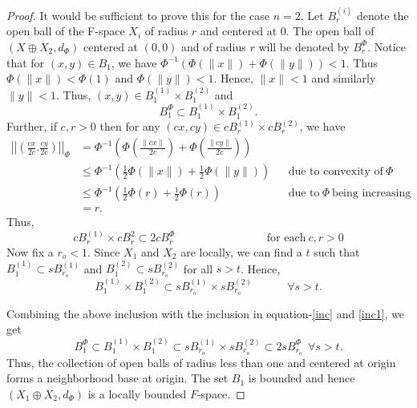\documentclass[10pt,a4paper]{amsart}
\begin{document}
	 \begin{proof}
	 	It would be sufficient to prove this for the case $n=2$. Let $B_r^{(i)}$ denote the open ball of the F-space $X_i$ of radius $r$ and centered at $0$.  The open ball of $\left(X\oplus X_2,d_\Phi\right)$ centered at $(0,0)$ and of radius $r$ will be denoted by $B_r^\Phi$. Notice that for $(x,y)\in B_1$, we have 
	 	$\Phi^{-1}\left(\Phi(\|x\|)+\Phi(\|y\|)\right)< 1$. Thus $\Phi(\|x\|)<\Phi(1)$ and $\Phi(\|y\|)<1$. Hence, $\|x\|<1$ and similarly $\|y\|<1$. Thus, $(x,y)\in B_1^{(1)}\times B_1^{(2)}$ and 
	 	\begin{equation}\label{inc}
	 		B_1^\Phi\subset B_1^{(1)}\times B_1^{(2)}.
	 	\end{equation}
	 	Further, if $c,r>0$ then for any $(cx,cy)\in cB_{r}^{(1)}\times cB_{r}^{(2)}$, we have 
	 	\begin{align}
	 		\left|\left|\left(\frac{cx}{2c}.\frac{cy}{2c}\right)\right|\right|_\Phi&=\Phi^{-1}\left(\Phi(\frac{\|cx\|}{2c})+\Phi(\frac{\|cy\|}{2c})\right)\nonumber\\&\leq\Phi^{-1}\left(\frac{1}{2}\Phi(\|x\|)+\frac{1}{2}\Phi(\|y\|)\right)&&\text{due to convexity of}~\Phi\nonumber\\&\leq \Phi^{-1}\left(\frac{1}{2}\Phi(r)+\frac{1}{2}\Phi(r)\right)&&\text{due to}~\Phi~\text{being increasing}\nonumber\\&=r.
	 	\end{align}
	 	Thus, \begin{equation}\label{inc1}
cB_{r}^{(1)}\times cB_{r}^{2}\subset 2cB_r^{\Phi}~~~~~~~~~~~~~~~~~~~~~~~~~~~~~~~~~~~~~\text{for each}~c,r>0
	 	\end{equation}
	 	Now fix a $r_o<1$. Since $X_1$ and $X_2$ are locally, we can find a $t$ such that $B_1^{(1)}\subset sB_{r_o}^{(1)}$ and $B_1^{(2)}\subset sB_{r_o}^{(2)}$ for all $s>t$. Hence, 
	 	\begin{equation}
	 		B_1^{(1)}\times B_1^{(2)}\subset sB_{r_o}^{(1)}\times sB_{r_o}^{(2)}~~~~~~~~~~~~~~\forall s>t.
	 	\end{equation}
	 	
	 	Combining the above inclusion with the inclusion in equation-\ref{inc} and \ref{inc1}, we get 
	 	\begin{equation}
B_1^\Phi\subset	B_1^{(1)}\times B_1^{(2)}\subset sB_{r_o}^{(1)}\times sB_{r_o}^{(2)}\subset 2sB_{r_o}^\Phi~~\forall s>t.
	 	\end{equation}
	 	Thus, the collection of open balls of radius less than one and centered at origin forms a neighborhood base at origin. The set $B_1$ is bounded and hence $\left(X_1\oplus X_2,d_\Phi\right)$ is a locally bounded $F$-space.
	 \end{proof}
\end{document}
